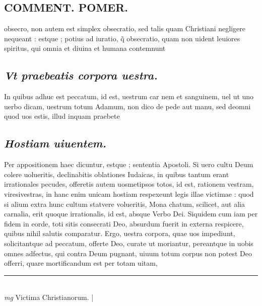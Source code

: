 \documentclass{article}
\begin{document}
\begin{pages}
\section*{COMMENT. POMER.  }\pstart obsecro, non autem est simplex obsecratio, sed talis quam Christiani negligere nequeant : estque ; potius ad iuratio, q̃ obsecratio, quam non uident leuiores spiritus, qui omnia et diuina et humana contemnunt\pend
{}
{}
\subsection*{\textit{Vt praebeatis corpora uestra. }}\pstart In quibus adhuc est peccatum, id est, uestrum car nem et sanguinem, uel ut uno uerbo dicam, uestrum totum Adamum, non dico de pede aut manu, sed deomni quod uos estis, illud inquam praebete\pend
{}
{}
\subsection*{\textit{Hostiam uiuentem. }}\pstart Per appositionem haec dicuntur, estque ; sententia Apostoli. Si uero cultu Deum colere uolueritis, declinabitis oblationes Iudaicas, in quibus tantum erant irrationales pecudes, offeretis autem uosmetipsos totos, id est, rationem vestram, viresivestras, in hanc enim unicam hostiam respexeunt legis illae victimae : quod si alium extra hunc cultum statvere volueritis, Mona chatum, scilicet, aut alia carnalia, erit quoque irrationalis, id est, absque Verbo Dei. Siquidem cum iam per fidem in eorde, toti sitis consecrati Deo, absurdum fuerit in externa respicere, quibus nihil salutis comparatur. Ergo, uestra corpora, quae uos impediunt, solicitantque ad peccatum, offerte Deo, curate ut moriantur, pereantque in uobis omnes adfectus, qui contra Deum pugnant, uiuum totum corpus non potest Deo offerri, quare mortificandum est per totam uitam,  \pend
\vspace{0.5cm}\noindent
\vspace{0.2cm}\rule{1cm}{0.2pt}\\ 
\hspace{0.2cm}\textit{mg}
\footnotesize Victima Christianorum.  
\normalsize| 

\end{pages}
\end{document}
